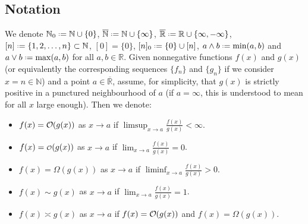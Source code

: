 \documentclass[11pt, a4paper, twoside]{article}
\newcommand\smallO{
	\mathchoice
	{{\scriptstyle\mathcal{O}}}{{\scriptstyle\mathcal{O}}}{{\scriptscriptstyle\mathcal{O}}}{\scalebox{.7}{$\scriptscriptstyle\mathcal{O}$}}}
\DeclareRobustCommand{\bigO}{\text{\usefont{OMS}{cmsy}{m}{n}O}}
\newcommand*{\defeq}{\mathrel{\vcenter{\baselineskip0.5ex \lineskiplimit0pt
			\hbox{\scriptsize.}\hbox{\scriptsize.}}}=}
\newcommand{\NN}{\mathbb{N}}
\newcommand{\NNN}{\overline{\mathbb{N}}}
\newcommand{\RR}{\mathbb{R}}
\numberwithin{equation}{section}
\begin{document}
	\subsection{Notation} 
	We denote $\NN_0\defeq\NN\cup\{0\}$, $\NNN\defeq\NN\cup\{\infty\}$, $\overline{\RR}\defeq\RR\cup\{\infty,-\infty\}$, $[n]\defeq\{1,2,\ldots,n\}\subset\NN$, $[0]=\{0\}$, $[n]_0\defeq\{0\}\cup[n]$, $a\wedge b\defeq\min(a,b)$ and $a\vee b\defeq \max(a,b)$ for all $a,b\in\RR$. Given nonnegative functions $f(x)$ and $g(x)$ (or equivalently the corresponding sequences $\{f_n\}$ and $\{g_n\}$ if we consider $x=n\in\NN$) and a point $a\in\overline{\RR}$, assume, for simplicity, that $g(x)$ is strictly positive in a punctured neighbourhood of $a$ (if $a=\infty$, this is understood to mean for all $x$ large enough). Then we denote:
	\begin{itemize}[noitemsep]
		\item $f(x)=\bigO(g(x))$ as $x\longrightarrow a$ if $\limsup_{x\longrightarrow a}\frac{f(x)}{g(x)}<\infty$.
		\item $f(x)=\smallO(g(x))$ as $x\longrightarrow a$ if $\lim_{x\longrightarrow a}\frac{f(x)}{g(x)}=0$.
		\item $f(x)=\Omega(g(x))$ as $x\longrightarrow a$ if $\liminf_{x\longrightarrow a}\frac{f(x)}{g(x)}>0$.
		\item $f(x)\sim g(x)$ as $x\longrightarrow a$ if $\lim_{x\longrightarrow a}\frac{f(x)}{g(x)}=1$.
		\item $f(x)\asymp g(x)$ as $x\longrightarrow a$ if $f(x)=\bigO(g(x))$ and $f(x)=\Omega(g(x))$.
	\end{itemize}
\end{document}
